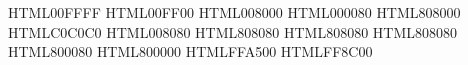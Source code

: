 \definecolor{aqua}   {HTML}{00FFFF}
\definecolor{lime}   {HTML}{00FF00} 
\definecolor{green}  {HTML}{008000} 
\definecolor{navy}   {HTML}{000080}  
\definecolor{olive}  {HTML}{808000} 
\definecolor{silver} {HTML}{C0C0C0}
\definecolor{teal}   {HTML}{008080}
\definecolor{ckgrey} {HTML}{808080}
\definecolor{grey}   {HTML}{808080}
\definecolor{gray}   {HTML}{808080}
\definecolor{purple} {HTML}{800080}
\definecolor{maroon} {HTML}{800000}
\definecolor{orange} {HTML}{FFA500}
\definecolor{darkorange} {HTML}{FF8C00}


\setlength{}  %
\setcounter{columnbadness}{7000}
\setcounter{finalcolumnbadness}{7000}



\usepackage{hyphenat}

